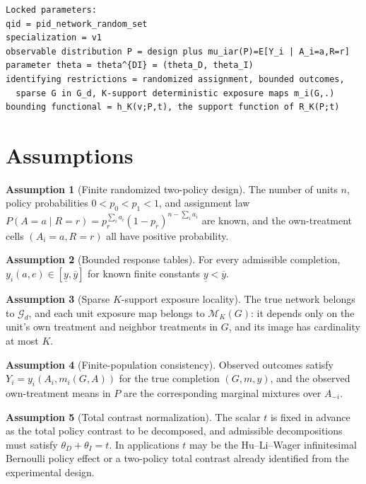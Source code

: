 \documentclass[11pt]{article}
\theoremstyle{definition}
\newtheorem{assumption}{Assumption}
\theoremstyle{plain}
\theoremstyle{remark}
\begin{document}
\begin{verbatim}
Locked parameters:
qid = pid_network_random_set
specialization = v1
observable distribution P = design plus mu_iar(P)=E[Y_i | A_i=a,R=r]
parameter theta = theta^{DI} = (theta_D, theta_I)
identifying restrictions = randomized assignment, bounded outcomes,
  sparse G in G_d, K-support deterministic exposure maps m_i(G,.)
bounding functional = h_K(v;P,t), the support function of R_K(P;t)
\end{verbatim}

\section{Assumptions}
\begin{assumption}[Finite randomized two-policy design]\label{ass:finite-design}
The number of units \(n\), policy probabilities \(0<p_0<p_1<1\), and assignment
law \(P(A=a\mid R=r)=p_r^{\sum_i a_i}(1-p_r)^{n-\sum_i a_i}\) are known, and
the own-treatment cells \((A_i=a,R=r)\) all have positive probability.
\end{assumption}

\begin{assumption}[Bounded response tables]\label{ass:bounded-response}
For every admissible completion, \(y_i(a,e)\in[\underline y,\overline y]\) for
known finite constants \(\underline y<\overline y\).
\end{assumption}

\begin{assumption}[Sparse \(K\)-support exposure locality]\label{ass:sparse-k}
The true network belongs to \(\mathcal G_d\), and each unit exposure map belongs
to \(\mathcal M_K(G)\): it depends only on the unit's own treatment and neighbor
treatments in \(G\), and its image has cardinality at most \(K\).
\end{assumption}

\begin{assumption}[Finite-population consistency]\label{ass:consistency}
Observed outcomes satisfy
\(Y_i=y_i(A_i,m_i(G,A))\) for the true completion \((G,m,y)\), and the observed
own-treatment means in \(P\) are the corresponding marginal mixtures over
\(A_{-i}\).
\end{assumption}

\begin{assumption}[Total contrast normalization]\label{ass:total-normalization}
The scalar \(t\) is fixed in advance as the total policy contrast to be
decomposed, and admissible decompositions must satisfy
\(\theta_D+\theta_I=t\).  In applications \(t\) may be the Hu--Li--Wager
infinitesimal Bernoulli policy effect or a two-policy total contrast already
identified from the experimental design.
\end{assumption}
\end{document}
